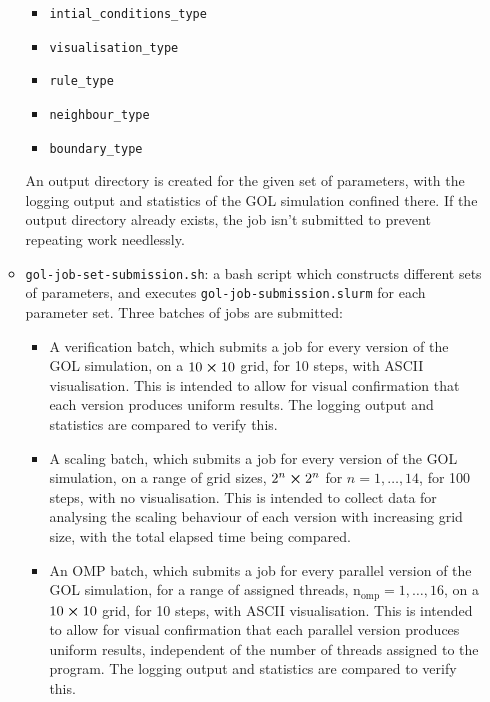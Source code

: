 \documentclass[draft]{article}
\begin{document}
\begin{itemize}
\begin{itemize}
\begin{itemize}
    \item \lstinline{intial_conditions_type}

    \item \lstinline{visualisation_type}

    \item \lstinline{rule_type}

    \item \lstinline{neighbour_type}

    \item \lstinline{boundary_type}
    \end{itemize}
    An output directory is created for the given set of parameters, with the
    logging output and statistics of the GOL simulation confined there.
    If the output directory already exists, the job isn't submitted to prevent
    repeating work needlessly.

  \item \lstinline{gol-job-set-submission.sh}: a bash script which constructs
    different sets of parameters, and executes
    \lstinline{gol-job-submission.slurm} for each parameter set.
    Three batches of jobs are submitted:
    \begin{itemize}
    \item A verification batch, which submits a job for every version of the GOL
      simulation, on a $10\cross10$ grid, for 10 steps, with ASCII
      visualisation.
      This is intended to allow for visual confirmation that each version
      produces uniform results.
      The logging output and statistics are compared to verify this.

    \item A scaling batch, which submits a job for every version of the GOL
      simulation, on a range of grid sizes, $2^{n}\cross2^{n}$ for
      $n = 1, \dotsc, 14$, for 100 steps, with no visualisation.
      This is intended to collect data for analysing the scaling behaviour of
      each version with increasing grid size, with the total elapsed time being
      compared.

    \item An OMP batch, which submits a job for every parallel version of the
      GOL simulation, for a range of assigned threads,
      $\mathrm{n_{omp}} = 1, \dotsc, 16$, on a $10\cross10$ grid, for 10 steps,
      with ASCII visualisation.
      This is intended to allow for visual confirmation that each parallel
      version produces uniform results, independent of the number of threads
      assigned to the program.
      The logging output and statistics are compared to verify this.
    \end{itemize}


\end{itemize}
\end{itemize}
\end{document}
